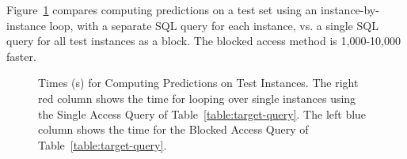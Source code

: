 \documentclass{acm_proc_article-sp}
\begin{document}
Figure~\ref{fig:test-timing} compares computing predictions on a test set using an instance-by-instance loop, with a separate SQL query for each instance, vs. a single SQL query for all test instances as a block. The blocked access method is 1,000-10,000 faster. 


\begin{figure}[htbp] %
 \centering
{} 
\caption{Times (s) for Computing Predictions on Test Instances. The right red column shows the time for looping over single instances using the Single Access Query of Table~\ref{table:target-query}. The left blue column shows the time for the Blocked Access Query of Table~\ref{table:target-query}.
}
 \label{fig:test-timing}
\end{figure}

\end{document}
